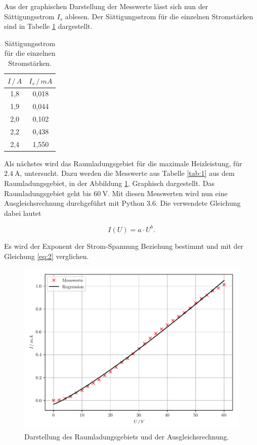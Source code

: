Aus der graphischen Darstellung der Messwerte lässt sich nun der Sättigungsstrom
$I_s$ ablesen. Der Sättigungsstrom für die einzelnen Stromstärken sind in Tabelle
\ref{tab:2} dargestellt.

\begin{table}[H]
  \centering
  \caption{Sättigungsstrom für die einzelnen Stromstärken.}
  \label{tab:2}
  \begin{tabular}{c c}
    \toprule
    $I \, / \, A$ & $I_s \, / \, mA$ \\
    \midrule
    1,8 & 0,018  \\
    1,9 & 0,044  \\
    2,0 & 0,102  \\
    2,2 & 0,438  \\
    2,4 & 1,550  \\
    \bottomrule
  \end{tabular}
\end{table}

Als nächstes wird das Raumladungsgebiet für die maximale Heizleistung, für $\SI{2.4}{\ampere}$,
untersucht. Dazu werden die Messwerte aus Tabelle \ref{tab:1} aus dem Raumladungsgebiet, in der Abbildung \ref{abb:7},
Graphisch dargestellt. Das Raumladungsgebiet geht bis $\SI{60}{\volt}$.
Mit diesen Messwerten wird nun eine Ausgleichsrechnung durchgeführt mit Python 3.6.
Die verwendete Gleichung dabei lautet

\begin{equation*}
  I(U) = a \cdot U^b.
\end{equation*}

Es wird der Exponent der Strom-Spannung Beziehung bestimmt und mit der Gleichung
\ref{eq:2} verglichen.

\begin{figure}[H]
  \centering
  \includegraphics{plot2.pdf}
  \caption{Darstellung des Raumladungsgebiets und der Ausgleichsrechnung.}
  \label{abb:7}
\end{figure}

